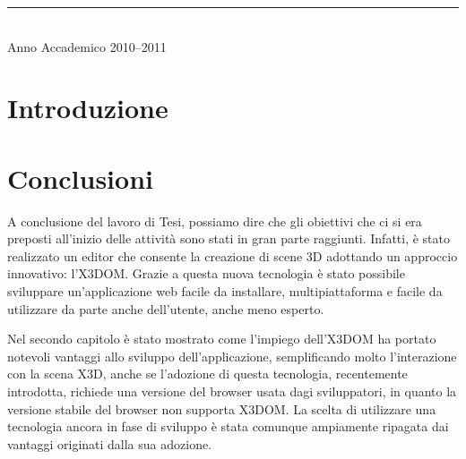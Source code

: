 \documentclass[a4paper,12pt]{report}
\def\annoaccademico{2010--2011}
\def\dedica{}
\newlength\corpo
\begin{document}
\begin{titlepage}
\vfill

\vspace{0.8cm}

\begin{center}

\rule{40mm}{0.01mm}\\

Anno Accademico \annoaccademico

\end{center}

\end{titlepage}
\newpage
\vspace*{2.5cm}
\begin{flushright}
\begin{Large}\emph{\dedica}\end{Large}
\end{flushright}
\frenchspacing
%

\tableofcontents
\listoffigures
{}
\chapter*{Introduzione}
\pagestyle{fancy}
\fancyfoot[RO]{\thepage \hfil}



\chapter*{Conclusioni}
A conclusione del lavoro di Tesi, possiamo dire che gli obiettivi che ci si era preposti all'inizio delle attivit\`a sono stati in gran parte raggiunti. Infatti, \`e stato  realizzato un editor che consente la creazione di scene 3D adottando un approccio innovativo:  l'X3DOM.  Grazie a questa nuova tecnologia \`e stato possibile sviluppare un'applicazione web facile da installare, multipiattaforma e facile da utilizzare da parte anche dell'utente, anche meno esperto. 

Nel secondo capitolo \`{e} stato mostrato come l'impiego dell'X3DOM ha portato notevoli vantaggi allo sviluppo dell'applicazione, semplificando molto l'interazione con la scena X3D, anche se l'adozione di questa tecnologia, recentemente introdotta, richiede una versione del browser usata dagi sviluppatori, in quanto la versione stabile del browser non supporta X3DOM. La scelta di utilizzare una tecnologia ancora in fase di sviluppo \`{e} stata comunque ampiamente ripagata dai vantaggi originati dalla sua adozione. 
\end{document}
